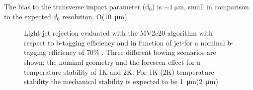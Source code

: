 The bias to the transverse impact parameter (d$_0$) is $\sim \SI{1}{\micro \meter}$, small in comparison to the expected $d_0$ resolution, O(\SI{10}{\micro \meter}).\\
\begin{figure}
\caption{Light-jet rejection evaluated with the MV2c20 algorithm with respect to b-tagging efficiency  and in function of jet-\pt for a nominal b-tagging efficiency of 70\% . Three different bowing scenarios are shown; the nominal geometry and the foreseen effect for a temperature stability of 1K and 2K. For 1K (2K) temperature stability the mechanical stability is expected to be \SI{1}{\micro\meter}(\SI{2}{\micro\meter}) }
\end{figure}
